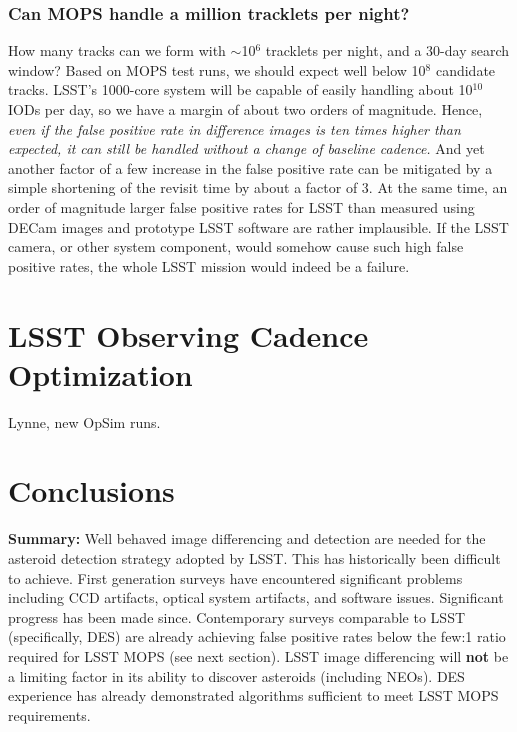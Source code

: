\documentclass[12pt,preprint]{aastex}
\begin{document}
\subsubsection{Can MOPS handle a million tracklets per night?} 

How many tracks can we form with $\sim$10$^6$ tracklets per night, and a 30-day search window? 
Based on MOPS test runs, we should expect well below 10$^8$ candidate tracks. LSST's 1000-core
system will be capable of easily handling about 10$^{10}$ IODs per day, so we have a margin
of about two orders of magnitude. Hence, {\it even if the false positive rate in difference images is 
ten times higher than expected, it can still be handled without a change of baseline cadence.}
And yet another factor of a few increase in the false positive rate can be mitigated by a simple
shortening of the revisit time by about a factor of 3. At the same time, an order of magnitude 
larger false positive rates for LSST than measured using DECam images and prototype LSST software
are rather implausible. If the LSST camera, or other system component, would somehow
cause such high false positive rates, the whole LSST mission would indeed be a failure. 



\newpage
\section{LSST Observing Cadence Optimization}

Lynne, new OpSim runs. 


\section{Conclusions}

{\bf Summary:} Well behaved image differencing and detection are needed for the
asteroid detection strategy adopted by LSST. This has historically
been difficult to achieve. First generation surveys have encountered
significant problems including CCD artifacts, optical system
artifacts, and software issues. Significant progress has been made
since. Contemporary surveys comparable to LSST (specifically, DES) are
already achieving false positive rates below the few:1 ratio required
for LSST MOPS (see next section). LSST image differencing will {\bf
not} be a limiting factor in its ability to discover asteroids
(including NEOs). DES experience has already demonstrated algorithms 
sufficient to meet LSST MOPS requirements.
\end{document}
